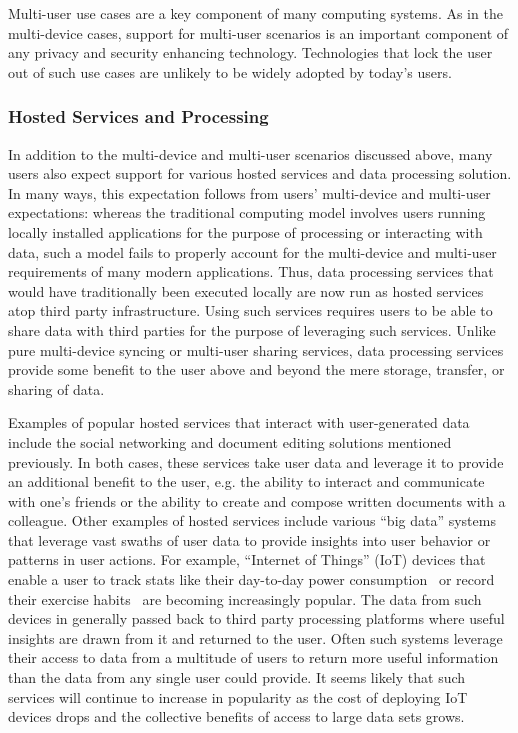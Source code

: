 Multi-user use cases are a key component of many computing systems. As
in the multi-device cases, support for multi-user scenarios is an
important component of any privacy and security enhancing
technology. Technologies that lock the user out of such use cases are
unlikely to be widely adopted by today's users.

\subsubsection{Hosted Services and Processing}

In addition to the multi-device and multi-user scenarios discussed
above, many users also expect support for various hosted services and
data processing solution. In many ways, this expectation follows from
users' multi-device and multi-user expectations: whereas the
traditional computing model involves users running locally installed
applications for the purpose of processing or interacting with data,
such a model fails to properly account for the multi-device and
multi-user requirements of many modern applications. Thus, data
processing services that would have traditionally been executed
locally are now run as hosted services atop third party
infrastructure. Using such services requires users to be able to share
data with third parties for the purpose of leveraging such
services. Unlike pure multi-device syncing or multi-user sharing
services, data processing services provide some benefit to the user
above and beyond the mere storage, transfer, or sharing of data.

Examples of popular hosted services that interact with user-generated
data include the social networking and document editing solutions
mentioned previously. In both cases, these services take user data and
leverage it to provide an additional benefit to the user, e.g. the
ability to interact and communicate with one's friends or the ability
to create and compose written documents with a colleague. Other
examples of hosted services include various ``big data'' systems that
leverage vast swaths of user data to provide insights into user
behavior or patterns in user actions. For example, ``Internet of
Things'' (IoT) devices that enable a user to track stats like their
day-to-day power consumption~\cite{neurio} or record their exercise
habits~\cite{fitbit} are becoming increasingly popular. The data from
such devices in generally passed back to third party processing
platforms where useful insights are drawn from it and returned to the
user. Often such systems leverage their access to data from a
multitude of users to return more useful information than the data
from any single user could provide. It seems likely that such services
will continue to increase in popularity as the cost of deploying IoT
devices drops and the collective benefits of access to large data sets
grows.

